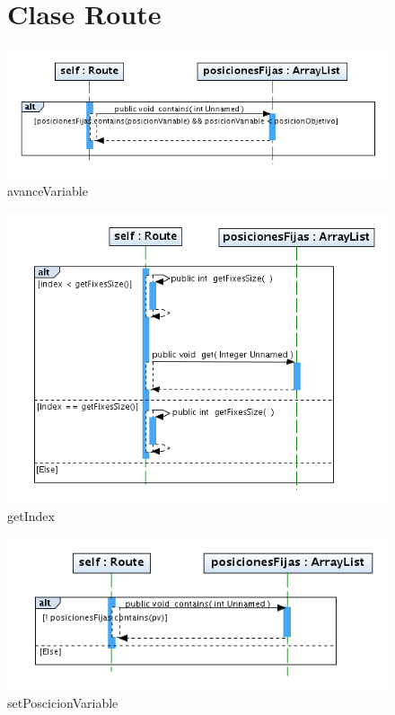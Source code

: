 \documentclass[letterpaper,12pt]{report}
\begin{document}
\begin{figure}
\section{Clase Route}
\centering
\includegraphics[width=1\textwidth]{Route/avanceVariable.png}
\caption{avanceVariable}
\end{figure}
\newpage
\begin{figure}
\centering
\includegraphics[width=1\textwidth]{Route/getIndex.png}
\caption{getIndex}
\end{figure}
\newpage
\begin{figure}
\centering
\includegraphics[width=1\textwidth]{Route/setPoscicionVariable.png}
\caption{setPoscicionVariable}
\end{figure}
\newpage
\end{document}
